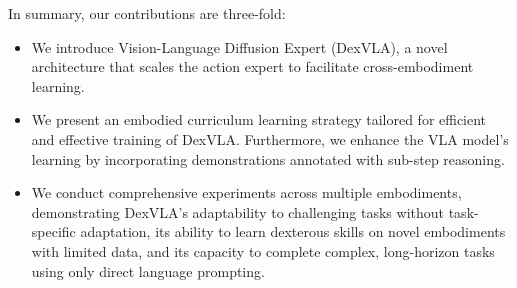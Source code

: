 In summary, our contributions are three-fold:
\begin{itemize}
    \item We introduce Vision-Language Diffusion Expert (DexVLA), a novel architecture that scales the action expert to facilitate cross-embodiment learning.
    \item We present an embodied curriculum learning strategy tailored for efficient and effective training of DexVLA. Furthermore, we enhance the VLA model's learning by incorporating demonstrations annotated with sub-step reasoning.
    \item We conduct comprehensive experiments across multiple embodiments, demonstrating DexVLA's adaptability to challenging tasks without task-specific adaptation, its ability to learn dexterous skills on novel embodiments with limited data, and its capacity to complete complex, long-horizon tasks using only direct language prompting.
\end{itemize}
